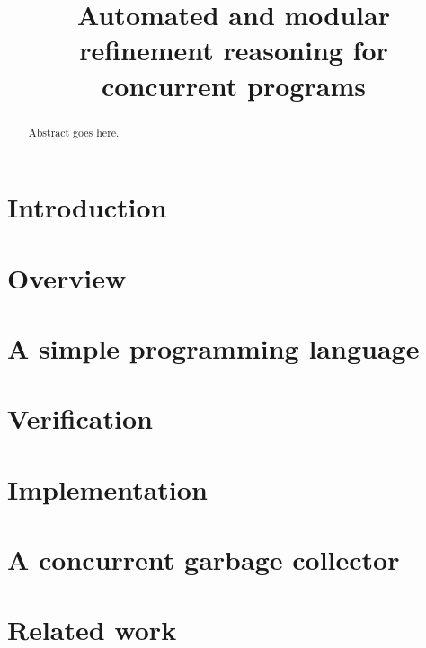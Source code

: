 \documentclass [preprint]{sigplanconf}
\theoremstyle{remark}
\theoremstyle{definition}
\begin{document}
\setlength{\pdfpageheight}{\paperheight}
\setlength{\pdfpagewidth}{\paperwidth}


\title{Automated and modular refinement reasoning for concurrent programs}
\authorinfo{}{}{}

\maketitle



\begin{abstract}
Abstract goes here.
\end{abstract}

\section{Introduction}
\label{sec:introduction}
% 
\section{Overview}
\label{sec:overview}

\section{A simple programming language}
\label{sec:language}

\section{Verification}
\label{sec:verification}

\section{Implementation}
\label{sec:implementation}
\section{A concurrent garbage collector}
\label{sec:GC}
\section{Related work}
\label{sec:related}
% 


%
\end{document}
